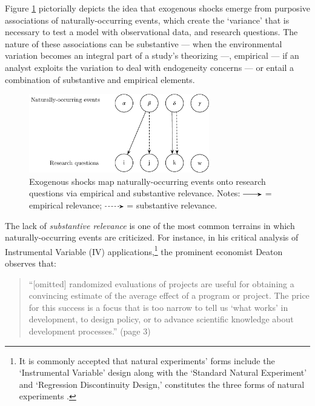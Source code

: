 \begin{refsection}
Figure \ref{fig:event_rq_mapping} pictorially depicts the idea that exogenous 
shocks emerge from purposive associations of naturally-occurring events, which
create the `variance' that is necessary to test a model with observational data,
and research questions. The nature of these associations can be substantive 
--- when the environmental variation becomes an integral part of a study's 
theorizing ---, empirical --- if an analyst exploits the variation to deal with
endogeneity concerns --- or entail a combination of substantive and
empirical elements.

\begin{figure}[!htbp]
  \centering
  \includegraphics[width=0.7\textwidth]{exhibits/event_rq_mapping.pdf}
  \caption{Exogenous shocks map naturally-occurring events onto 
  research questions via empirical and substantive relevance. Notes:
  \includegraphics[width=0.075\textwidth]{exhibits/event_rq_mapping_0.pdf}
  = empirical relevance; 
  \includegraphics[width=0.075\textwidth]{exhibits/event_rq_mapping_1.pdf}
   = substantive relevance.}
  \label{fig:event_rq_mapping}
\end{figure}

The lack of \textit{substantive relevance} is one of the most common terrains in which
naturally-occurring events are criticized. For instance, in his critical
analysis of Instrumental Variable (IV) applications,\footnote{It is commonly
accepted that natural experiments' forms include the `Instrumental Variable'
design along with the `Standard Natural Experiment' and `Regression
Discontinuity Design,'  constitutes the three forms of natural experiments
\parencite{sieweke_santoni_2020,dunning_2012}.} the prominent economist
Deaton \parencite*{deaton_2009} observes that:

\begin{quote}
  ``[omitted] randomized evaluations of projects are useful for obtaining a convincing
  estimate of the average effect of a program or project. The price for this
  success is a focus that is too narrow to tell us `what works' in development,
  to design policy, or to advance scientific knowledge about development
  processes.'' (page 3)
\end{quote}


\end{refsection}

